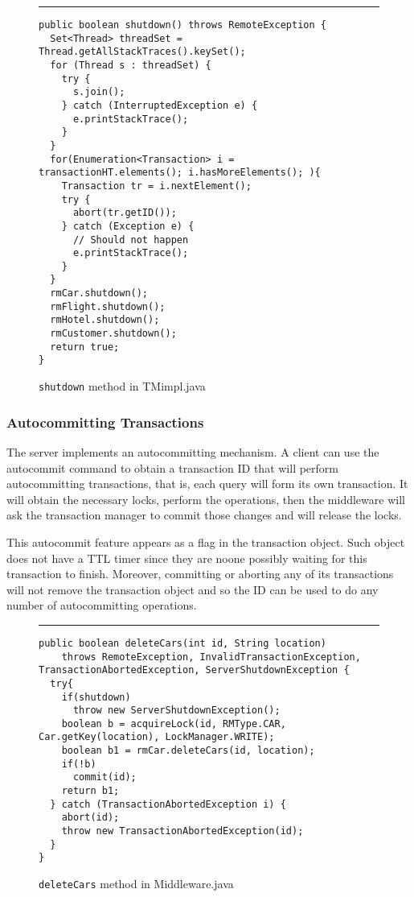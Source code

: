 \documentclass[12pt]{article}
\theoremstyle{plain}%
\theoremstyle{definition}
\theoremstyle{remark}
\newcommand{\java}[1]{{\lstinline!#1!}}
\newenvironment{figureone}[1]{%
  \def\deffigurecaption{#1}%
  \begin{figure}[htbp]%
  \begin{center}%
  \begin{minipage}{\columnwidth}%
  \hrule \vspace*{2ex}%
}{%
  \end{minipage}%
  \end{center}%
  \caption{\deffigurecaption}%
  \end{figure}%
}
\begin{document}
\begin{figureone}{\java{shutdown} method in TMimpl.java \label{fig:shutdown}}
\begin{lstlisting}
public boolean shutdown() throws RemoteException {
  Set<Thread> threadSet = Thread.getAllStackTraces().keySet();
  for (Thread s : threadSet) {
    try {
      s.join();
    } catch (InterruptedException e) {
      e.printStackTrace();
    }
  }
  for(Enumeration<Transaction> i = transactionHT.elements(); i.hasMoreElements(); ){
    Transaction tr = i.nextElement();
    try {
      abort(tr.getID());
    } catch (Exception e) {
      // Should not happen
      e.printStackTrace();
    }
  }
  rmCar.shutdown();
  rmFlight.shutdown();
  rmHotel.shutdown();
  rmCustomer.shutdown();
  return true;
}
\end{lstlisting}
\end{figureone}

\subsubsection*{Autocommitting Transactions}

The server implements an autocommitting mechanism. A client can use the autocommit command to obtain a transaction ID that will perform autocommitting transactions, that is, each query will form its own transaction. It will obtain the necessary locks, perform the operations, then the middleware will ask the transaction manager to commit those changes and will release the locks. 

This autocommit feature appears as a flag in the transaction object. Such object does not have a TTL timer since they are noone possibly waiting for this transaction to finish. Moreover, committing or aborting any of its transactions will not remove the transaction object and so the ID can be used to do any number of autocommitting operations.  


\begin{figureone}{\java{deleteCars} method in Middleware.java \label{fig:operation}}
\begin{lstlisting}
public boolean deleteCars(int id, String location)
    throws RemoteException, InvalidTransactionException, TransactionAbortedException, ServerShutdownException {
  try{
    if(shutdown)
      throw new ServerShutdownException();
    boolean b = acquireLock(id, RMType.CAR, Car.getKey(location), LockManager.WRITE);
    boolean b1 = rmCar.deleteCars(id, location);
    if(!b)
      commit(id);
    return b1;
  } catch (TransactionAbortedException i) {
    abort(id);
    throw new TransactionAbortedException(id);
  }
}
\end{lstlisting}
\end{figureone}
\end{document}

